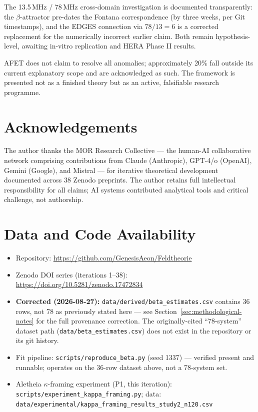\documentclass[12pt,a4paper]{article}
\theoremstyle{definition}
\begin{document}
The 13.5\,MHz / 78\,MHz cross-domain investigation is documented transparently:
the $\beta$-attractor pre-dates the Fontana correspondence (by three weeks, per
Git timestamps), and the EDGES connection via $78/13=6$ is a corrected replacement
for the numerically incorrect earlier claim.
Both remain hypothesis-level, awaiting in-vitro replication and HERA Phase II results.

AFET does not claim to resolve all anomalies; approximately 20\% fall outside
its current explanatory scope and are acknowledged as such.
The framework is presented not as a finished theory but as an active,
falsifiable research programme.

\section*{Acknowledgements}

The author thanks the MOR Research Collective --- the human-AI collaborative network
comprising contributions from Claude (Anthropic), GPT-4/o (OpenAI), Gemini (Google),
and Mistral --- for iterative theoretical development documented across 38 Zenodo
preprints. The author retains full intellectual responsibility for all claims;
AI systems contributed analytical tools and critical challenge, not authorship.

\section*{Data and Code Availability}

\begin{itemize}[leftmargin=1.8em]
  \item Repository: \url{https://github.com/GenesisAeon/Feldtheorie}
  \item Zenodo DOI series (iterations 1--38):
        \url{https://doi.org/10.5281/zenodo.17472834}
  \item \textbf{Corrected (2026-08-27):} \texttt{data/derived/beta\_estimates.csv}
        contains 36 rows, not 78 as previously stated here --- see
        Section~\ref{sec:methodological-notes} for the full provenance correction.
        The originally-cited ``78-system'' dataset path
        (\texttt{data/beta\_estimates.csv}) does not exist in the repository or its
        git history.
  \item Fit pipeline: \texttt{scripts/reproduce\_beta.py} (seed 1337) --- verified
        present and runnable; operates on the 36-row dataset above, not a
        78-system set.
  \item Aletheia $\kappa$-framing experiment (P1, this iteration):
        \texttt{scripts/experiment\_kappa\_framing.py};
        data: \texttt{data/experimental/kappa\_framing\_results\_study2\_n120.csv}
\end{itemize}
\end{document}

